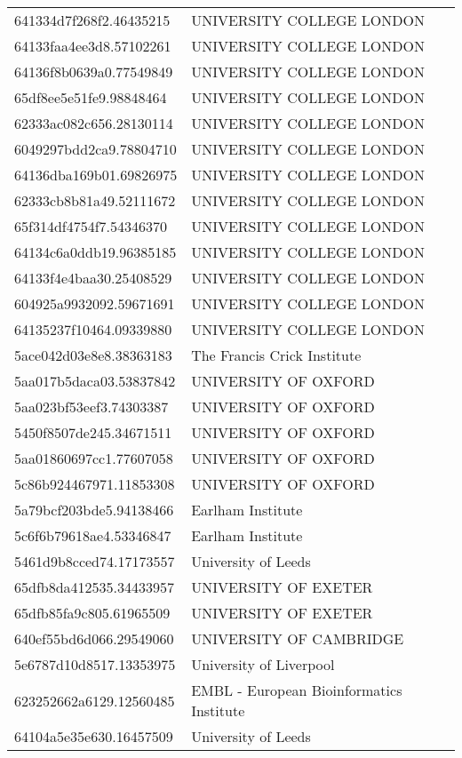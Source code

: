 \begin{tabular}{ll}
641334d7f268f2.46435215 & UNIVERSITY COLLEGE LONDON \\
64133faa4ee3d8.57102261 & UNIVERSITY COLLEGE LONDON \\
64136f8b0639a0.77549849 & UNIVERSITY COLLEGE LONDON \\
65df8ee5e51fe9.98848464 & UNIVERSITY COLLEGE LONDON \\
62333ac082c656.28130114 & UNIVERSITY COLLEGE LONDON \\
6049297bdd2ca9.78804710 & UNIVERSITY COLLEGE LONDON \\
64136dba169b01.69826975 & UNIVERSITY COLLEGE LONDON \\
62333cb8b81a49.52111672 & UNIVERSITY COLLEGE LONDON \\
65f314df4754f7.54346370 & UNIVERSITY COLLEGE LONDON \\
64134c6a0ddb19.96385185 & UNIVERSITY COLLEGE LONDON \\
64133f4e4baa30.25408529 & UNIVERSITY COLLEGE LONDON \\
604925a9932092.59671691 & UNIVERSITY COLLEGE LONDON \\
64135237f10464.09339880 & UNIVERSITY COLLEGE LONDON \\
5ace042d03e8e8.38363183 & The Francis Crick Institute \\
5aa017b5daca03.53837842 & UNIVERSITY OF OXFORD \\
5aa023bf53eef3.74303387 & UNIVERSITY OF OXFORD \\
5450f8507de245.34671511 & UNIVERSITY OF OXFORD \\
5aa01860697cc1.77607058 & UNIVERSITY OF OXFORD \\
5c86b924467971.11853308 & UNIVERSITY OF OXFORD \\
5a79bcf203bde5.94138466 & Earlham Institute \\
5c6f6b79618ae4.53346847 & Earlham Institute \\
5461d9b8cced74.17173557 & University of Leeds \\
65dfb8da412535.34433957 & UNIVERSITY OF EXETER \\
65dfb85fa9c805.61965509 & UNIVERSITY OF EXETER \\
640ef55bd6d066.29549060 & UNIVERSITY OF CAMBRIDGE \\
5e6787d10d8517.13353975 & University of Liverpool \\
623252662a6129.12560485 & EMBL - European Bioinformatics Institute \\
64104a5e35e630.16457509 & University of Leeds \\

\end{tabular}
